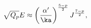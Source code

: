 \begin{equation}
\sqrt{Q_p}E \approx \left(\frac{\alpha'}{\ka}\right)^{\frac{5-p}{2}}
J^{\frac{7-p}{2}},
\end{equation}


